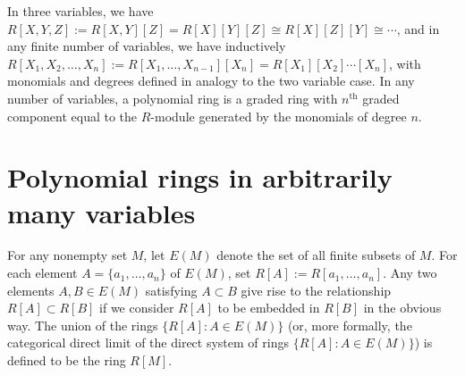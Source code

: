 \documentclass{article}
\begin{document}
In three variables, we have $R[X,Y,Z] := R[X,Y][Z] = R[X][Y][Z] \cong R[X][Z][Y] \cong \cdots$, and in any finite number of variables, we have inductively $R[X_1,X_2,\dots,X_n] := R[X_1,\dots,X_{n-1}][X_n] = R[X_1][X_2]\cdots[X_n]$, with monomials and degrees defined in analogy to the two variable case. In any number of variables, a polynomial ring is a graded ring with $n^\mathrm{th}$ graded component equal to the $R$-module generated by the monomials of degree $n$.

\section{Polynomial rings in arbitrarily many variables}

For any nonempty set $M$, let $E(M)$ denote the set of all finite subsets of $M$. For each element $A = \{a_1, \ldots ,a_n\}$ of $E(M)$, set $R[A]:=R[a_1,\ldots,a_n]$.  Any two elements $A,B \in E(M)$ satisfying $A \subset B$ give rise to the relationship $R[A] \subset R[B]$ if we consider $R[A]$ to be embedded in $R[B]$ in the obvious way. The union of the rings $\{R[A] : A \in E(M)\}$ (or, more formally, the categorical direct limit of the direct system of rings $\{R[A] : A \in E(M)\}$) is defined to be the ring $R[M]$.
\end{document}
